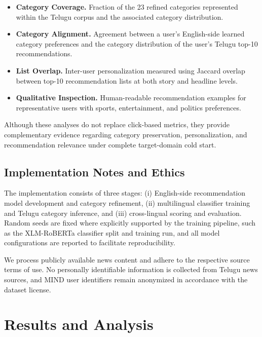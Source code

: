 \documentclass[conference]{IEEEtran}
\begin{document}
\begin{itemize}

\item \textbf{Category Coverage.} Fraction of the 23 refined categories represented within the Telugu corpus and the associated category distribution.

\item \textbf{Category Alignment.} Agreement between a user's English-side learned category preferences and the category distribution of the user's Telugu top-10 recommendations.

\item \textbf{List Overlap.} Inter-user personalization measured using Jaccard overlap between top-10 recommendation lists at both story and headline levels.

\item \textbf{Qualitative Inspection.} Human-readable recommendation examples for representative users with sports, entertainment, and politics preferences.

\end{itemize}

Although these analyses do not replace click-based metrics, they provide complementary evidence regarding category preservation, personalization, and recommendation relevance under complete target-domain cold start.

\subsection{Implementation Notes and Ethics}

The implementation consists of three stages: (i) English-side recommendation model development and category refinement, (ii) multilingual classifier training and Telugu category inference, and (iii) cross-lingual scoring and evaluation. Random seeds are fixed where explicitly supported by the training pipeline, such as the XLM-RoBERTa classifier split and training run, and all model configurations are reported to facilitate reproducibility.

We process publicly available news content and adhere to the respective source terms of use. No personally identifiable information is collected from Telugu news sources, and MIND user identifiers remain anonymized in accordance with the dataset license.


\section{Results and Analysis}
\end{document}
